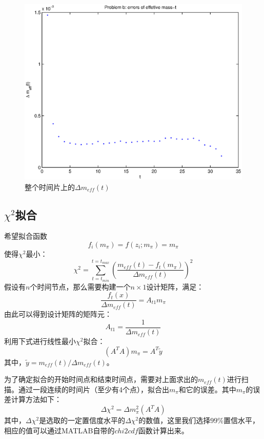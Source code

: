 \documentclass[paper=a4, fontsize=11pt]{scrartcl} %
\numberwithin{equation}{section} %
\numberwithin{figure}{section} %
\numberwithin{table}{section} %
\begin{document}
\begin{CJK*}{UTF8}{gbsn}
\begin{figure}[H]
\includegraphics[width=150mm]{problem3_b_2.eps}
\caption{整个时间片上的$\Delta m_{eff}(t)$}
\end{figure}
\subsection{$\chi^2$拟合}
希望拟合函数
\begin{equation}
f_i(m_\pi) = f(z_i;m_\pi) = m_\pi
\end{equation}
使得$\chi^2$最小：
\begin{equation}
\chi^2 = \sum_{t=t_{min}}^{t=t_{max}} (\frac{m_{eff}(t)-f_t(m_\pi)}{\Delta m_{eff}(t)})^2
\end{equation}
假设有$n$个时间节点，那么需要构建一个$n \times 1$设计矩阵，满足：
\begin{equation}
\frac{f_t(x)}{\Delta m_{eff}(t)} = A_{t1}m_\pi
\end{equation}
由此可以得到设计矩阵的矩阵元：
\begin{equation}
A_{t1} = \frac{1}{\Delta m_{eff}(t)}
\end{equation}
利用下式进行线性最小$\chi^2$拟合：
\begin{equation}
(A^TA)m_\pi = A^T \widetilde{y}
\end{equation}
其中，$\widetilde{y} = m_{eff}(t)/ \Delta m_{eff}(t)$。

为了确定拟合的开始时间点和结束时间点，需要对上面求出的$m_{eff}(t)$进行扫描。通过一段连续的时间片（至少有4个点），拟合出$m_\pi$和它的误差。其中$m_\pi$的误差计算方法如下：
\begin{equation}
\Delta \chi^2 = \Delta m_\pi^2 (A^T A)
\end{equation}
其中，$\Delta \chi^2$是选取的一定置信度水平的$\Delta \chi^2$的数值，这里我们选择$99\%$置信水平，相应的值可以通过MATLAB自带的$chi2cdf$函数计算出来。


\end{CJK*}
\end{document}

